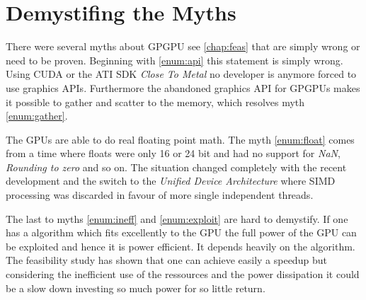 \section{Demystifing the Myths} %
\label{sec:demystifing_the_myths}
There were several myths about \gls{GPGPU} see \autoref{chap:feas} that are simply wrong or need to be proven. Beginning with \autoref{enum:api} this statement is 
simply wrong. Using \gls{CUDA} or the ATI \gls{SDK} \emph{Close To Metal}
no developer is anymore forced to use graphics \glspl{API}. Furthermore the abandoned graphics \gls{API} for \glspl{GPGPU} makes it possible to gather and scatter to the memory, which resolves myth \autoref{enum:gather}. 

The \glspl{GPU} are able to do real floating point math. The myth \autoref{enum:float} comes from a time where floats were only 16 or 24 bit and had no support for \emph{NaN}, \emph{Rounding to zero} and so on. The situation changed completely with the recent development and the switch to the \emph{Unified Device Architecture} where \gls{SIMD} processing was discarded in 
favour of more single independent threads. 

The last to myths \autoref{enum:ineff} and \autoref{enum:exploit} are hard to demystify.
If one has a algorithm which fits excellently to the \gls{GPU} the full power of
the \gls{GPU} can be exploited and hence it is power efficient. It depends
heavily on the algorithm. The feasibility study has shown that one can achieve
easily a speedup but considering the inefficient use of the ressources and the
power dissipation it could be a slow down investing so much power for so little
return.








